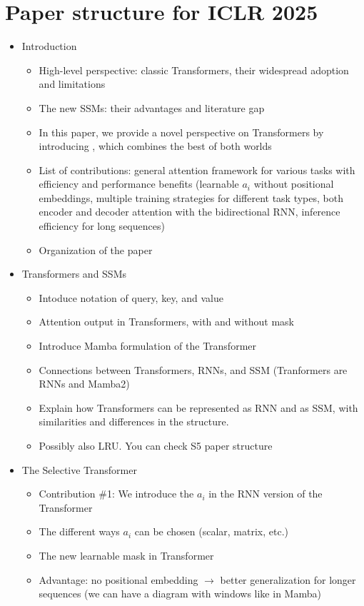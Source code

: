 \section*{Paper structure for {ICLR 2025}}

\begin{itemize}[leftmargin=0pt]

\item[] {\large Introduction}
\begin{itemize}
    \item High-level perspective: classic Transformers, their widespread adoption and limitations
    \item The new SSMs: their advantages and literature gap
    \item In this paper, we provide a novel perspective on Transformers by introducing \ours, which combines the best of both worlds
    \item List of contributions: general attention framework for various tasks with efficiency and performance benefits (learnable $a_i$ without positional embeddings, multiple training strategies for different task types, both encoder and decoder attention with the bidirectional RNN, inference efficiency for long sequences)
    \item Organization of the paper
\end{itemize}

\item[] {\large Transformers and SSMs}
\begin{itemize}
    \item Intoduce notation of query, key, and value
    \item Attention output in Transformers, with and without mask
    \item Introduce Mamba formulation of the Transformer
    \item Connections between Transformers, RNNs, and SSM (Tranformers are RNNs and Mamba2)
    \item Explain how Transformers can be represented as RNN and as SSM, with similarities and differences in the structure.
    \item Possibly also LRU. You can check S5 paper structure
\end{itemize}

\item[] {\large The Selective Transformer}
\begin{itemize}
    \item Contribution \#1: We introduce the $a_i$ in the RNN version of the Transformer
    \item The different ways $a_i$ can be chosen (scalar, matrix, etc.)
    \item The new learnable mask in Transformer
    \item Advantage: no positional embedding $\to$ better generalization for longer sequences (we can have a diagram with windows like in Mamba)
\end{itemize}


\end{itemize}
